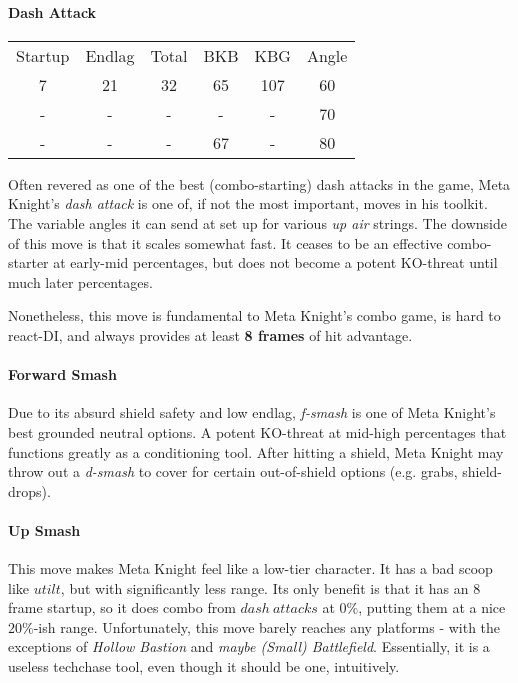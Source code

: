 \paragraph{Dash Attack}
\begin{center}
	\begin{tabular}{| c  c  c | c  c  c |}
		\hline
		Startup	& Endlag & Total & BKB & KBG & Angle \\
		7	&	21	&	32	&	65	&	107 & 	60\deg \\
		-	&	-	&	-	&	- 	& 	- 	&	70\deg	\\
		-	&	-	&	-	&	67	&	-	&	80\deg	\\
		\hline
	\end{tabular}
\end{center}
Often revered as one of the best (combo-starting) dash attacks in the game, %
 Meta Knight's \emph{dash attack} is one of, if not the most important, moves in his toolkit. The variable angles it can send at set up for various \textit{up air} strings. The downside of this move is that it scales somewhat fast. It ceases to be an effective combo-starter at early-mid percentages, but does not become a potent KO-threat until much later percentages.

Nonetheless, this move is fundamental to Meta Knight's combo game, is hard to react-DI, and always provides at least \textbf{8 frames} of hit advantage.

\paragraph{Forward Smash}
Due to its absurd shield safety and low endlag, \textit{f-smash} is one of Meta Knight's best grounded neutral options. A potent KO-threat at mid-high percentages that functions greatly as a conditioning tool. After hitting a shield, Meta Knight may throw out a \textit{d-smash} to cover for certain out-of-shield options (e.g. grabs, shield-drops).

\paragraph{Up Smash}
This move makes Meta Knight feel like a low-tier character. It has a bad scoop like $utilt$, but with significantly less range. Its only benefit is that it has an 8 frame startup, so it does combo from $dash\ attacks$ at $0\%$, putting them at a nice $20\%$-ish range. Unfortunately, this move barely reaches any platforms - with the exceptions of \textit{Hollow Bastion} and \textit{maybe (Small) Battlefield}. Essentially, it is a useless techchase tool, even though it should be one, intuitively.

